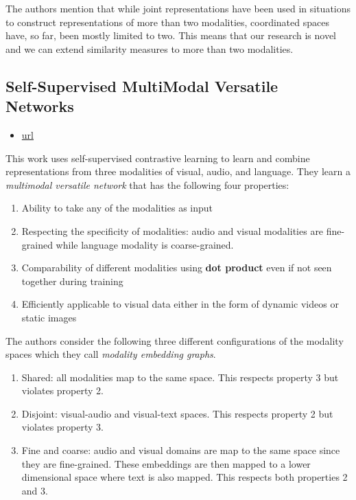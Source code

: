 The authors mention that while joint representations have been used in situations to construct representations of more than two modalities, coordinated spaces have, so far, been mostly limited to two. This means that our research is novel and we can extend similarity measures to more than two modalities.

\subsection{Self-Supervised MultiModal Versatile Networks}

\begin{itemize}
\item \href{https://proceedings.neurips.cc/paper/2020/file/0060ef47b12160b9198302ebdb144dcf-Paper.pdf?utm\_campaign=NLP\%20News\&utm\_medium=email\&utm\_source=Revue\%20newsletter}{url}
\end{itemize}


This work uses self-supervised contrastive learning to learn and combine representations from three modalities of visual, audio, and language. They learn a \textit{multimodal versatile network} that has the following four properties:
\begin{enumerate}
\item Ability to take any of the modalities as input
\item Respecting the specificity of modalities: audio and visual modalities are fine-grained while language modality is coarse-grained.
\item Comparability of different modalities using \textbf{dot product} even if not seen together during training 
\item Efficiently applicable to visual data either in the form of dynamic videos or static images
\end{enumerate}


The authors consider the following three different configurations of the modality spaces which they call \textit{modality embedding graphs}.
\begin{enumerate}
\item Shared: all modalities map to the same space. This respects property 3 but violates property 2.
\item Disjoint: visual-audio and visual-text spaces. This respects property 2 but violates property 3.
\item Fine and coarse: audio and visual domains are map to the same space since they are fine-grained. These embeddings are then mapped to a lower dimensional space where text is also mapped. This respects both properties 2 and 3.
\end{enumerate}

